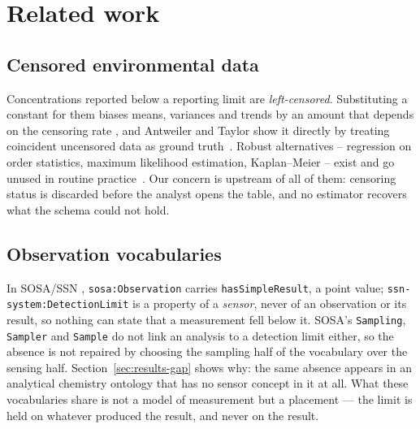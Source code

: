 \section{Related work}

\subsection{Censored environmental data}
Concentrations reported below a reporting limit are \emph{left-censored}.
Substituting a constant for them biases means, variances and trends by an
amount that depends on the censoring rate
\cite{helsel2006fabricating,helsel2012nondetects}, and Antweiler and Taylor
show it directly by treating coincident uncensored data as ground
truth~\cite{antweiler2008censored}. Robust alternatives -- regression on order
statistics, maximum likelihood estimation, Kaplan--Meier -- exist and go unused
in routine practice~\cite{shoari2018nondetects}. Our concern is upstream of all
of them: censoring status is discarded before the analyst opens the table, and
no estimator recovers what the schema could not hold.

\subsection{Observation vocabularies}
In SOSA/SSN \cite{janowicz2019sosa,haller2019ssn}, \texttt{sosa:Observation}
carries \texttt{hasSimpleResult}, a point value;
\texttt{ssn-system:DetectionLimit} is a property of a \emph{sensor}, never of an
observation or its result, so nothing can state that a measurement fell below
it. SOSA's \texttt{Sampling}, \texttt{Sampler} and \texttt{Sample} do not link
an analysis to a detection limit either, so the absence is not repaired by
choosing the sampling half of the vocabulary over the sensing half.
Section~\ref{sec:results-gap} shows why: the same absence appears in an
analytical chemistry ontology that has no sensor concept in it at all. What
these vocabularies share is not a model of measurement but a placement --- the
limit is held on whatever produced the result, and never on the result.

